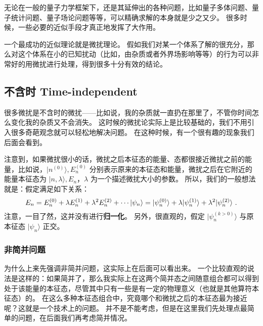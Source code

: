 
\begin{issues}
\issueMissDepend
\end{issues}

无论在一般的量子力学框架下，还是其延伸出的各种问题，比如量子多体问题、量子统计问题、量子场论问题等等，可以精确求解的本身就是少之又少。 很多时候，一些必要的近似手段才真正地发挥了大作用。

一个最成功的近似理论就是微扰理论。 假如我们对某一个体系了解的很充分，那么对这个体系在小的已知扰动（比如，由杂质或者外界场影响等等）的行为可以非常好的用微扰进行处理，得到很多十分有效的结论。

\subsection{不含时 Time-independent}

很多微扰是不含时的微扰——比如说，我的杂质就一直扔在那里了，不管你时间怎么变化我的杂质又不会消失。 这时候的微扰论实际上是比较基础的，我们不用引入很多奇葩观念就可以轻松地解决问题。 在这种时候，有一个很有趣的现象我们后面会看到。

注意到，如果微扰很小的话，微扰之后本征态的能量、态都很接近微扰之前的能量，比如说，$|n^{(0)}\rangle, E_n^{(0)}$ 分别表示原来的本征态和能量，微扰之后在它附近的能量本征态为 $|n,\lambda\rangle, E_n$，$\lambda$ 为一个描述微扰大小的参数。 所以，我们的一般想法就是：假定满足如下关系：
\begin{equation}
E_n = E_n^{(0)} + \lambda E_n^{(1)} + \lambda^2 E_n^{(2)} + \cdots\\
|\psi_n\rangle = |\psi_n^{(0)}\rangle + \lambda|\psi_n^{(1)}\rangle + \lambda^2 |\psi_n^{(2)}\rangle~.
\end{equation}
注意，一目了然，这并没有进行\textbf{归一化}。 另外，很直观的，假定 $|\psi_n^{(k>0)}\rangle$ 与原本征态 $|\psi_n\rangle$ 正交。

\subsubsection{非简并问题}

为什么上来先强调非简并问题，这实际上在后面可以看出来。 一个比较直观的说法是这样的：如果简并了，那么我实际上在这两个简并态之间随意组合都可以得到处于该能量的本征态，尽管其中只有一些是有一定的物理意义（也就是其他算符本征态）的。 在这么多种本征态组合中，究竟哪个和微扰之后的本征态最为接近呢？这就是一个技术上的问题。 并不是不能考虑，但是在这里我们先处理点最简单的问题，在后面我们再考虑简并情况。

